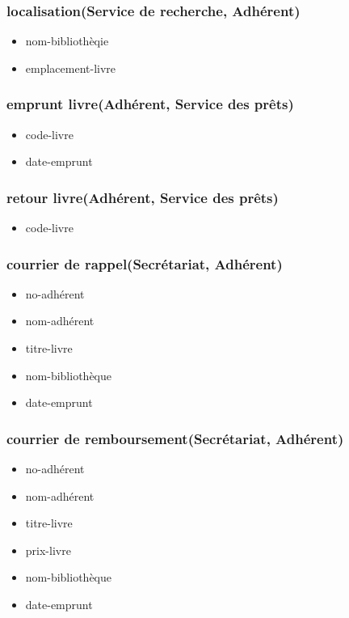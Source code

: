 \subsubsection*{localisation(Service de recherche, Adhérent)}
\begin{itemize}
    \item nom-bibliothèqie
    \item emplacement-livre
\end{itemize}

\subsubsection*{emprunt livre(Adhérent, Service des prêts)}
\begin{itemize}
    \item code-livre
    \item date-emprunt
\end{itemize}

\subsubsection*{retour livre(Adhérent, Service des prêts)}
\begin{itemize}
    \item code-livre
\end{itemize}

\subsubsection*{courrier de rappel(Secrétariat, Adhérent)}
\begin{itemize}
    \item no-adhérent
    \item nom-adhérent
    \item titre-livre
    \item nom-bibliothèque
    \item date-emprunt
\end{itemize}

\subsubsection*{courrier de remboursement(Secrétariat, Adhérent)}
\begin{itemize}
    \item no-adhérent
    \item nom-adhérent
    \item titre-livre
    \item prix-livre
    \item nom-bibliothèque
    \item date-emprunt
\end{itemize}

